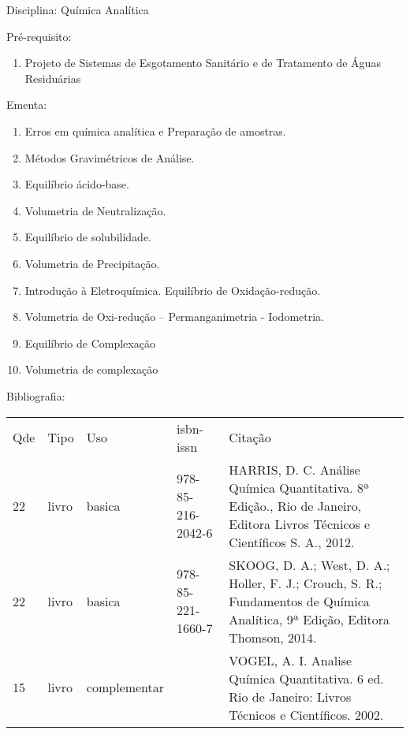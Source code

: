 \documentclass[12pt,a4paper,twoside]{report}
\begin{document}
Disciplina: Química Analítica

Pré-requisito:
\begin{enumerate}
\item Projeto de Sistemas de Esgotamento Sanitário e de Tratamento de Águas Residuárias
\end{enumerate}

Ementa:
\begin{enumerate}
\item Erros em química analítica e Preparação de amostras.
\item Métodos Gravimétricos de Análise.
\item Equilíbrio ácido-base.
\item Volumetria de Neutralização.
\item Equilíbrio de solubilidade.
\item Volumetria de Precipitação.
\item Introdução à Eletroquímica.  Equilíbrio de Oxidação-redução.
\item Volumetria de Oxi-redução – Permanganimetria -  Iodometria.
\item Equilíbrio de Complexação
\item Volumetria de complexação
\end{enumerate}

Bibliografia:
\begin{tabular}{lllll}
Qde & Tipo & Uso & isbn-issn & Citação \\
22&livro&basica&978-85-216-2042-6&HARRIS, D. C. Análise Química Quantitativa. 8ª Edição., Rio de Janeiro, Editora  Livros Técnicos e Científicos S. A., 2012.\\
22&livro&basica&978-85-221-1660-7&SKOOG, D. A.; West, D. A.; Holler, F. J.; Crouch, S. R.; Fundamentos de Química Analítica, 9ª Edição, Editora Thomson, 2014.\\
15&livro&complementar&&VOGEL, A. I. Analise Química Quantitativa. 6 ed. Rio de Janeiro: Livros Técnicos e Científicos. 2002.\\
\end{tabular}
\end{document}
